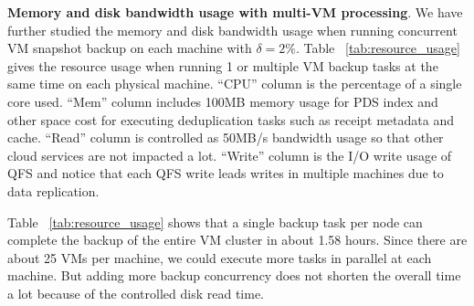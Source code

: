 {\bf Memory and disk bandwidth usage with multi-VM processing}. 
We have further studied the memory and disk bandwidth usage 
when running concurrent VM snapshot backup on each machine with $\delta=2\%$. 
Table ~\ref{tab:resource_usage} gives the resource usage  when
running 1 or multiple  VM backup tasks at the same time on each physical machine. 
``CPU'' column is the percentage of a single core used. 
``Mem'' column includes 100MB memory usage for PDS index and other space cost for executing deduplication tasks such as 
receipt metadata and cache. 
``Read'' column is controlled as 50MB/s bandwidth usage so that other cloud services are not impacted a lot.
``Write'' column is the I/O write usage of QFS and notice that each QFS write leads writes in multiple machines due to
data replication.     

Table ~\ref{tab:resource_usage} shows that  a single backup task per node can complete the backup of the entire
VM cluster in about 1.58 hours. Since there are about 25 VMs per machine, we could execute
more tasks in parallel at each machine. But adding more backup concurrency does not shorten the overall time
a lot because of the controlled  disk read time.


